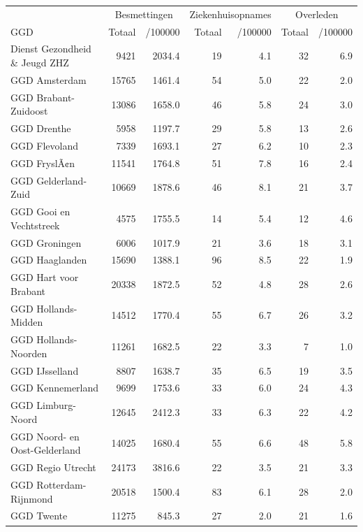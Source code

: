 \documentclass[
  english,
  man,floatsintext]{apa6}
\begin{document}
\begin{table}
\centering\begingroup\fontsize{10}{12}\selectfont

\begin{threeparttable}
\begin{tabular}{lrrrrrr}
\toprule
\multicolumn{1}{c}{ } & \multicolumn{2}{c}{Besmettingen} & \multicolumn{2}{c}{Ziekenhuisopnames} & \multicolumn{2}{c}{Overleden} \\
\cmidrule(l{3pt}r{3pt}){2-3} \cmidrule(l{3pt}r{3pt}){4-5} \cmidrule(l{3pt}r{3pt}){6-7}
GGD & Totaal & /100000 & Totaal & /100000 & Totaal & /100000\\
\midrule
Dienst Gezondheid \& Jeugd ZHZ & 9421 & 2034.4 & 19 & 4.1 & 32 & 6.9\\
GGD Amsterdam & 15765 & 1461.4 & 54 & 5.0 & 22 & 2.0\\
GGD Brabant-Zuidoost & 13086 & 1658.0 & 46 & 5.8 & 24 & 3.0\\
GGD Drenthe & 5958 & 1197.7 & 29 & 5.8 & 13 & 2.6\\
GGD Flevoland & 7339 & 1693.1 & 27 & 6.2 & 10 & 2.3\\
GGD FryslÃ¢n & 11541 & 1764.8 & 51 & 7.8 & 16 & 2.4\\
GGD Gelderland-Zuid & 10669 & 1878.6 & 46 & 8.1 & 21 & 3.7\\
GGD Gooi en Vechtstreek & 4575 & 1755.5 & 14 & 5.4 & 12 & 4.6\\
GGD Groningen & 6006 & 1017.9 & 21 & 3.6 & 18 & 3.1\\
GGD Haaglanden & 15690 & 1388.1 & 96 & 8.5 & 22 & 1.9\\
GGD Hart voor Brabant & 20338 & 1872.5 & 52 & 4.8 & 28 & 2.6\\
GGD Hollands-Midden & 14512 & 1770.4 & 55 & 6.7 & 26 & 3.2\\
GGD Hollands-Noorden & 11261 & 1682.5 & 22 & 3.3 & 7 & 1.0\\
GGD IJsselland & 8807 & 1638.7 & 35 & 6.5 & 19 & 3.5\\
GGD Kennemerland & 9699 & 1753.6 & 33 & 6.0 & 24 & 4.3\\
GGD Limburg-Noord & 12645 & 2412.3 & 33 & 6.3 & 22 & 4.2\\
GGD Noord- en Oost-Gelderland & 14025 & 1680.4 & 55 & 6.6 & 48 & 5.8\\
GGD Regio Utrecht & 24173 & 3816.6 & 22 & 3.5 & 21 & 3.3\\
GGD Rotterdam-Rijnmond & 20518 & 1500.4 & 83 & 6.1 & 28 & 2.0\\
GGD Twente & 11275 & 845.3 & 27 & 2.0 & 21 & 1.6\\

\end{tabular}
\end{threeparttable}
\end{table}
\end{document}
